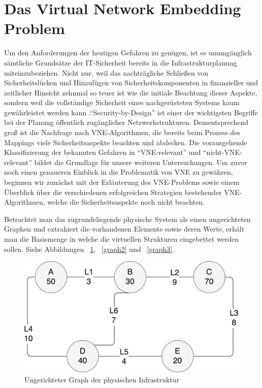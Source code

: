 \documentclass{lni}
\begin{document}
\section{Das Virtual Network Embedding Problem}
\label{sec:VNE-Problem}
Um den Anforderungen der heutigen Gefahren zu genügen, ist es unumgänglich sämtliche Grundsätze der IT-Sicherheit bereits in die Infrastrukturplanung miteinzubeziehen. Nicht nur, weil das nachträgliche Schließen von Sicherheitslücken und Hinzufügen von Sicherheitskomponenten in finanzieller und zeitlicher Hinsicht zehnmal so teuer ist wie die initiale Beachtung dieser Aspekte, sondern weil die vollständige Sicherheit eines nachgerüsteten Systems kaum gewährleistet werden kann \cite{Cole}."`Security-by-Design"' ist einer der wichtigsten Begriffe bei der Planung öffentlich zugänglicher Netzwerkstrukturen. Dementsprechend groß ist die Nachfrage nach VNE-Algorithmen, die bereits beim Prozess des Mappings viele Sicherheitsaspekte beachten und abdecken. Die vorausgehende Klassifizierung der bekannten Gefahren in "`VNE-relevant"' und "`nicht-VNE-relevant"' bildet die Grundlage für unsere weiteren Untersuchungen. Um zuvor noch einen genaueren Einblick in die Problematik von VNE zu gewähren, beginnen wir zunächst mit der Erläuterung des VNE-Problems sowie einem Überblick über die verschiedenen erfolgreichen Strategien bestehender VNE-Algorithmen, welche die Sicherheitsaspekte noch nicht beachten. 

Betrachtet man das zugrundeliegende physische System als einen ungerichteten Graphen und extrahiert die vorhandenen Elemente sowie deren Werte, erhält man die Basismenge in welche die virtuellen Strukturen eingebettet werden sollen. Siehe Abbildungen ~\ref{graph1}, ~\ref{graph2} und ~\ref{graph3}.


\begin{figure}[htb]
\begin{center}
\includegraphics[width=\textwidth]{physical_structure2.pdf}\newline
\caption{\label{graph1}Ungerichteter Graph der physischen Infrastruktur}
\end{center}
\end{figure}
\end{document}
